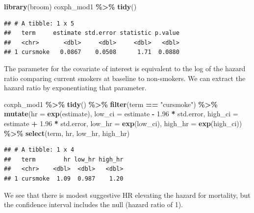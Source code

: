\documentclass[
]{book}
\newenvironment{Shaded}{\begin{snugshade}}{\end{snugshade}}
\newcommand{\AttributeTok}[1]{\textcolor[rgb]{0.13,0.29,0.53}{#1}}
\newcommand{\FloatTok}[1]{\textcolor[rgb]{0.00,0.00,0.81}{#1}}
\newcommand{\FunctionTok}[1]{\textcolor[rgb]{0.13,0.29,0.53}{\textbf{#1}}}
\newcommand{\NormalTok}[1]{#1}
\newcommand{\SpecialCharTok}[1]{\textcolor[rgb]{0.81,0.36,0.00}{\textbf{#1}}}
\newcommand{\StringTok}[1]{\textcolor[rgb]{0.31,0.60,0.02}{#1}}
\begin{document}
\begin{Shaded}
\begin{Highlighting}[]
\FunctionTok{library}\NormalTok{(broom)}
\NormalTok{coxph\_mod1 }\SpecialCharTok{\%\textgreater{}\%}
  \FunctionTok{tidy}\NormalTok{()}
\end{Highlighting}
\end{Shaded}

\begin{verbatim}
## # A tibble: 1 x 5
##   term     estimate std.error statistic p.value
##   <chr>       <dbl>     <dbl>     <dbl>   <dbl>
## 1 cursmoke   0.0867    0.0508      1.71  0.0880
\end{verbatim}

The parameter for the covariate of interest is equivalent to the log of the hazard ratio comparing current smokers at baseline to non-smokers. We can extract the hazard ratio by exponentiating that parameter.

\begin{Shaded}
\begin{Highlighting}[]
\NormalTok{coxph\_mod1 }\SpecialCharTok{\%\textgreater{}\%} 
  \FunctionTok{tidy}\NormalTok{() }\SpecialCharTok{\%\textgreater{}\%} 
  \FunctionTok{filter}\NormalTok{(term }\SpecialCharTok{==} \StringTok{"cursmoke"}\NormalTok{) }\SpecialCharTok{\%\textgreater{}\%} 
  \FunctionTok{mutate}\NormalTok{(}\AttributeTok{hr =} \FunctionTok{exp}\NormalTok{(estimate),}
         \AttributeTok{low\_ci =}\NormalTok{ estimate }\SpecialCharTok{{-}} \FloatTok{1.96} \SpecialCharTok{*}\NormalTok{ std.error, }
         \AttributeTok{high\_ci =}\NormalTok{ estimate }\SpecialCharTok{+} \FloatTok{1.96} \SpecialCharTok{*}\NormalTok{ std.error, }
         \AttributeTok{low\_hr =} \FunctionTok{exp}\NormalTok{(low\_ci), }
         \AttributeTok{high\_hr =} \FunctionTok{exp}\NormalTok{(high\_ci)) }\SpecialCharTok{\%\textgreater{}\%} 
  \FunctionTok{select}\NormalTok{(term, hr, low\_hr, high\_hr)}
\end{Highlighting}
\end{Shaded}

\begin{verbatim}
## # A tibble: 1 x 4
##   term        hr low_hr high_hr
##   <chr>    <dbl>  <dbl>   <dbl>
## 1 cursmoke  1.09  0.987    1.20
\end{verbatim}

We see that there is modest suggestive HR elevating the hazard for mortality, but the confidence interval includes the null (hazard ratio of 1).
\end{document}
